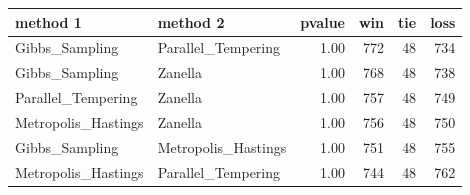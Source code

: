 \begin{table}[ht]
\centering
\begin{tabular}{llrrrr}
  \hline
method 1 & method 2 & pvalue & win & tie & loss \\ 
  \hline
Gibbs\_Sampling & Parallel\_Tempering & 1.00 & 772 &  48 & 734 \\ 
  Gibbs\_Sampling & Zanella & 1.00 & 768 &  48 & 738 \\ 
  Parallel\_Tempering & Zanella & 1.00 & 757 &  48 & 749 \\ 
  Metropolis\_Hastings & Zanella & 1.00 & 756 &  48 & 750 \\ 
  Gibbs\_Sampling & Metropolis\_Hastings & 1.00 & 751 &  48 & 755 \\ 
  Metropolis\_Hastings & Parallel\_Tempering & 1.00 & 744 &  48 & 762 \\ 
   \hline
\end{tabular}
\end{table}
